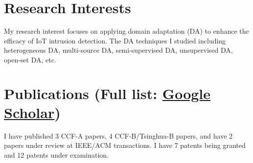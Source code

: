 \documentclass[letterpaper,11pt]{article}
\begin{document}
\vspace{1pt}

\section{Research Interests}

My research interest focuses on applying domain adaptation (DA) to enhance the efficacy of IoT intrusion detection. The DA techniques I studied including heterogeneous DA, multi-source DA, semi-supervised DA, unsupervised DA, open-set DA, etc. 

\vspace{1pt}

\section{Publications (Full list: \href{https://scholar.google.com/citations?user=wGgUbQkAAAAJ}{Google Scholar})}

I have published 3 CCF-A papers, 4 CCF-B/Tsinghua-B papers, and have 2 papers under review at IEEE/ACM transactions. I have 7 patents being granted and 12 patents under examination. 
\end{document}
